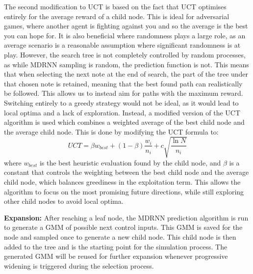 The second modification to UCT is based on the fact that UCT optimises entirely for the average reward of a child node. This is ideal for adversarial games, where another agent is fighting against you and so the average is the best you can hope for. It is also beneficial where randomness plays a large role, as an average scenario is a reasonable assumption where significant randomness is at play. However, the search tree is not completely controlled by random processes, as while MDRNN sampling is random, the prediction function is not. This means that when selecting the next note at the end of search, the part of the tree under that chosen note is retained, meaning that the best found path can realistically be followed. This allows us to instead aim for paths with the maximum reward. Switching entirely to a greedy strategy would not be ideal, as it would lead to local optima and a lack of exploration. Instead, a modified version of the UCT algorithm is used which combines a weighted average of the best child node and the average child node. This is done by modifying the UCT formula to:
\begin{equation}
    UCT = \beta w_{best} + (1-\beta)\frac{w_i}{n_i} + c\sqrt{\frac{\ln{N}}{n_i}}
\end{equation}
where $w_{best}$ is the best heuristic evaluation found by the child node, and $\beta$ is a constant that controls the weighting between the best child node and the average child node, which balances greediness in the exploitation term. This allows the algorithm to focus on the most promising future directions, while still exploring other child nodes to avoid local optima.

\textbf{Expansion:}
After reaching a leaf node, the MDRNN prediction algorithm is run to generate a GMM of possible next control inputs. This GMM is saved for the node and sampled once to generate a new child node. This child node is then added to the tree and is the starting point for the simulation process. The generated GMM will be reused for further expansion whenever progressive widening is triggered during the selection process.

